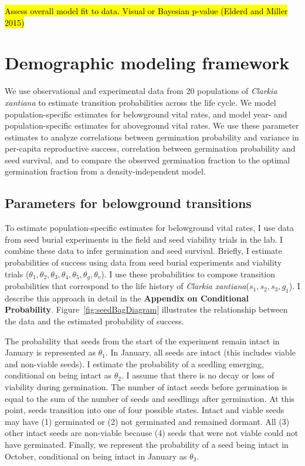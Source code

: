 \documentclass[12pt, oneside, titlepage]{article}   	%
\begin{document}
\hl{Assess overall model fit to data. Visual or Bayesian p-value (Elderd and Miller 2015)}
\fi

\section{Demographic modeling framework}

We use observational and experimental data from 20 populations of \textit{Clarkia xantiana} to estimate transition probabilities across the life cycle. We model population-specific estimates for belowground vital rates, and model year- and population-specific estimates for aboveground vital rates. We use these parameter estimates to analyze correlations between germination probability and variance in per-capita reproductive success, correlation between germination probability and seed survival, and to compare the observed germination fraction to the optimal germination fraction from a density-independent model. 

\subsection{Parameters for belowground transitions}

To estimate population-specific estimates for belowground vital rates, I use data from seed burial experiments in the field and seed viability trials in the lab. I combine these data to infer germination and seed survival. Briefly, I estimate probabilities of success using data from seed burial experiments and viability trials ($\theta_1, \theta_2, \theta_3, \theta_4, \theta_5, \theta_g, \theta_v$). I use these probabilities to compose transition probabilities that correspond to the life history of \textit{Clarkia xantiana}($s_1, s_2, s_3, g_1$). I describe this approach in detail in the \textbf{Appendix on Conditional Probability}. Figure~\ref{fig:seedBagDiagram} illustrates the relationship between the data and the estimated probability of success. 
 
The probability that seeds from the start of the experiment remain intact in January is represented as $\theta_1$. In January, all seeds are intact (this includes viable and non-viable seeds). I estimate the probability of a seedling emerging, conditional on being intact as $\theta_2$. I assume that there is no decay or loss of viability during germination. The number of intact seeds before germination is equal to the sum of the number of seeds and seedlings after germination. At this point, seeds transition into one of four possible states. Intact and viable seeds may have (1) germinated or (2) not germinated and remained dormant. All (3) other intact seeds are non-viable because (4) seeds that were not viable could not have germinated. Finally, we represent the probability of a seed being intact in October, conditional on being intact in January as $\theta_3$.
\end{document}
